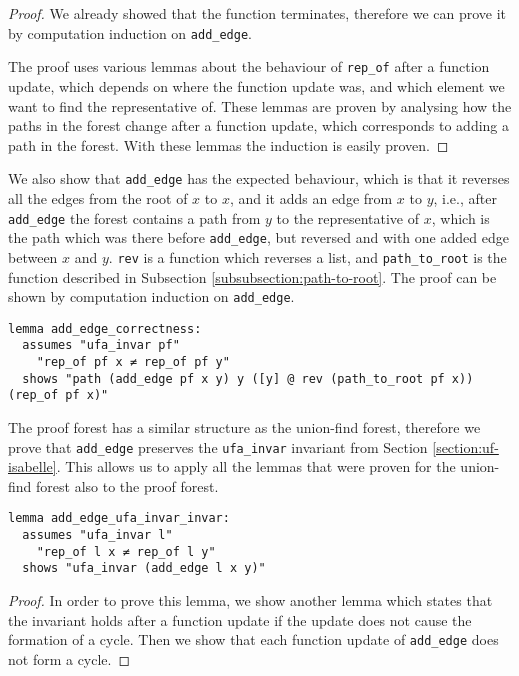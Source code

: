 \begin{proof}
We already showed that the function terminates, therefore we can prove it by computation induction on \lstinline{add_edge}.

The proof uses various lemmas about the behaviour of \lstinline{rep_of} after a function update, which depends on where the function update was, and which element we want to find the representative of. These lemmas are proven by analysing how the paths in the forest change after a function update, which corresponds to adding a path in the forest. With these lemmas the induction is easily proven.
\end{proof}

We also show that \lstinline|add_edge| has the expected behaviour, which is that it reverses all the edges from the root of $x$ to $x$, and it adds an edge from $x$ to $y$, i.e., after \lstinline|add_edge| the forest contains a path from $y$ to the representative of $x$, which is the path which was there before \lstinline|add_edge|, but reversed and with one added edge between $x$ and $y$. \lstinline|rev| is a function which reverses a list, and \lstinline|path_to_root| is the function described in Subsection \ref{subsubsection:path-to-root}. The proof can be shown by computation induction on \lstinline|add_edge|.

\begin{lstlisting}
lemma add_edge_correctness:
  assumes "ufa_invar pf"
    "rep_of pf x ≠ rep_of pf y"
  shows "path (add_edge pf x y) y ([y] @ rev (path_to_root pf x)) (rep_of pf x)"
\end{lstlisting}

The proof forest has a similar structure as the union-find forest, therefore we prove that \lstinline|add_edge| preserves the \lstinline|ufa_invar| invariant from Section \ref{section:uf-isabelle}. This allows us to apply all the lemmas that were proven for the union-find forest also to the proof forest.

\begin{lstlisting}
lemma add_edge_ufa_invar_invar:
  assumes "ufa_invar l"
    "rep_of l x ≠ rep_of l y"
  shows "ufa_invar (add_edge l x y)"
\end{lstlisting}

\begin{proof}
In order to prove this lemma, we show another lemma which states that the invariant holds after a function update if the update does not cause the formation of a cycle. Then we show that each function update of \lstinline{add_edge} does not form a cycle.
\end{proof}

